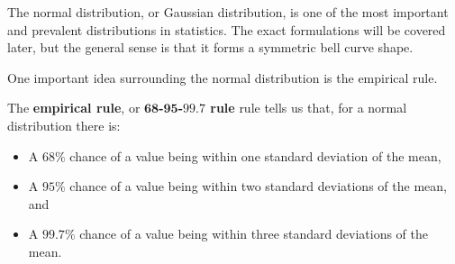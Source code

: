 The normal distribution, or Gaussian distribution, is one of the most important
and prevalent distributions in statistics. The exact formulations will be
covered later, but the general sense is that it forms a symmetric bell curve shape.

One important idea surrounding the normal distribution is the empirical rule.

\begin{blackbox}
    \begin{definition}
        The \textbf{empirical rule}, or \textbf{\( \mathbf{68} \)-\( \mathbf{95} \)-\( \mathbf{99.7} \) rule} rule tells us that, for a normal distribution there is:
        \begin{itemize}
            \item A \( 68\% \) chance of a value being within one standard deviation of the mean,
            \item A \( 95\% \) chance of a value being within two standard deviations of the mean, and
            \item A \( 99.7\% \) chance of a value being within three standard deviations of the mean.
        \end{itemize}
    \end{definition}
\end{blackbox}

\vspace{0.3cm}

